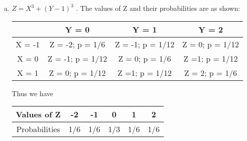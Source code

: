 \documentclass[a4paper,12pt]{article}
\begin{document}
\begin{enumerate}[(a)]
\begin{eqnarray*}
Cov(X, Y) &=& E(XY) - E(X)E(Y) \\ 
&=& \frac{1}{6} − (0)(1) \\ &=& 1/6\\
\end{eqnarray*}

\begin{eqnarray*}Corr(X, Y) \\ &=& \frac{Cov(X, Y)}{Var(X ) Var(Y  )}
\\ &=& \frac{1/6}{2/3} \\ &=& \frac{1/6}{2/3}
\end{eqnarray*}
$X$ and $Y$ are not independent: their correlation (or covariance) is non-zero. (In fact we
saw in part (i) that they are linearly related: $Y = X + 1$.)

\begin{framed}
(iv) Find the probability distribution of $Z = X^3 + (Y - 1)^3$.
\end{framed}
\item $Z = X^3 + (Y - 1)^3$ . The values of Z and their probabilities are as shown:
\begin{center}
\begin{tabular}{|c|c|c|c|}
 & Y = 0 & Y = 1 & Y = 2 \\ \hline

X = -1  &  Z = -2; p = 1/6  & Z = -1; p = 1/12 & Z = 0; p = 1/12  \\ \hline
X = 0  &  Z = -1; p = 1/12 & Z = 0; p = 1/6   & Z =1; p = 1/12
   \\ \hline
X = 1  & Z = 0; p = 1/12 & Z =1; p = 1/12 & Z = 2; p = 1/6 \\ \hline
\end{tabular}
\end{center}
Thus we have

\begin{center}
\begin{tabular}{|c|c|c|c|c|c|} \hline
Values of Z & -2&  -1&  0 & 1 & 2\\  \hline
Probabilities &  1/6&  1/6&  1/3&  1/6&  1/6\\ \hline
\end{tabular}
\end{center}

\end{enumerate}
\end{document}
